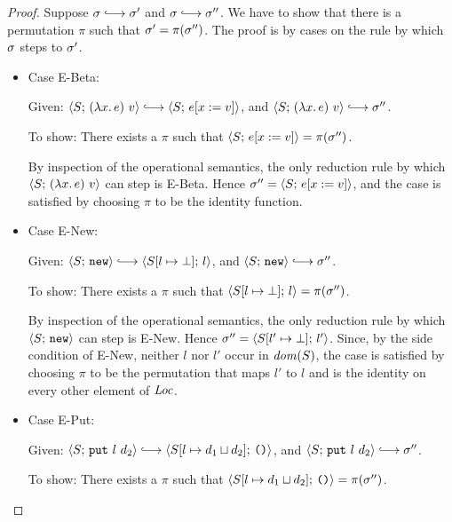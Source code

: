 \begin{proof}
  Suppose $\conf \parstepsto \conf'$ and $\conf \parstepsto \conf''$.
  We have to show that there is a permutation $\pi$ such that $\sigma'
  = \pi(\sigma'')$.  The proof is by cases on the rule by which $\sigma$
  steps to $\sigma'$.

  \begin{itemize}

    \item Case {\sc E-Beta}:

      Given:
      $\config{S}{\app{(\lam{x}{e})}{v}} \parstepsto \config{S}{\subst{e}{x}{v}}$,
      and $\config{S}{\app{(\lam{x}{e})}{v}} \parstepsto \conf''$.

      To show: There exists a $\pi$ such that
      $\langle S;\, e[x := v] \rangle = \pi(\sigma'')$.

      By inspection of the operational semantics, the only reduction
      rule by which $\langle S;\, (\lambda x.\,e)~v \rangle$ can step is
      {\sc E-Beta}.  Hence $\sigma'' = \langle S;\, e[x := v] \rangle$,
      and the case is satisfied by choosing $\pi$ to be the identity
      function.

      \item Case {\sc E-New}: 

      Given:
      $\config{S}{\NEW} \parstepsto \config{\extSRaw{S}{l}{\bot}}{l}$,
      and $\config{S}{\NEW} \parstepsto \conf''$.

      To show: There exists a $\pi$ such that
      $\langle S[l \mapsto \bot];\, l \rangle = \pi(\sigma'')$.

      By inspection of the operational semantics, the only reduction
      rule by which $\langle S;\, \mbox{\texttt{new}} \rangle$ can step is {\sc E-New}.  Hence
      $\sigma'' = \langle S[l' \mapsto \bot];\, l' \rangle$.  Since, by the
      side condition of {\sc E-New}, neither $l$ nor $l'$ occur in
      $\mathit{dom}(S)$, the case is satisfied by choosing $\pi$ to be the
      permutation that maps $l'$ to $l$ and is the identity on every
      other element of $\mathit{Loc}$.

      \item Case {\sc E-Put}:

      Given:
      $\config{S}{\putexp{l}{d_2}} \parstepsto \config{\extSRaw{S}{l}{\userlub{d_1}{d_2}}}{\unit}$,
      and $\config{S}{\putexp{l}{d_2}} \parstepsto \conf''$.

      To show: There exists a $\pi$ such that
      $\langle S[l \mapsto d_1 \sqcup d_2];\, \mbox{\texttt{()}} \rangle =
      \pi(\sigma'')$.


\end{itemize}
\end{proof}

